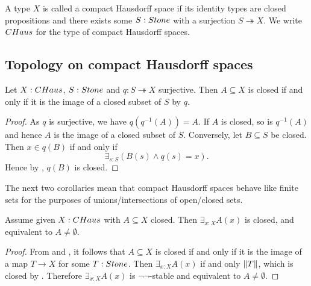 \begin{definition}
  A type $X$ is called a compact Hausdorff space if its identity types are closed propositions and there exists some $S:\Stone$ with a surjection $S\twoheadrightarrow X$. We write $\CHaus$ for the type of compact Hausdorff spaces.
\end{definition}


\subsection{Topology on compact Hausdorff spaces}

\begin{lemma}\label{CompactHausdorffClosed}
  Let $X:\CHaus$, $S:\Stone$ and $q:S\twoheadrightarrow X$ surjective.
  Then $A\subseteq X$ is closed if and only if it is the image of a closed subset of $S$ by $q$. 
\end{lemma}
\begin{proof}
  As $q$ is surjective, we have $q(q^{-1}(A)) = A$.
  If $A$ is closed, so is $q^{-1}(A)$ and 
  hence $A$ is the image of a closed subset of $S$. 
  Conversely, let $B\subseteq S$ be closed. Then $x\in q(B)$ if and only if
   \[\exists_{s:S} (B(s) \wedge q(s) = x).\]
   Hence by , $q(B)$ is closed. 
\end{proof}

The next two corollaries mean that compact Hausdorff spaces behave like finite sets for the purposes of unions/intersections of open/closed sets.

\begin{corollary}\label{InhabitedClosedSubSpaceClosedCHaus}
Assume given $X:\Chaus$ with $A\subseteq X$ closed. Then $\exists_{x:X} A(x)$ is closed, and equivalent to $A \neq \emptyset$. 
\end{corollary}

\begin{proof}
From  and , it follows that $A\subseteq X$ is closed if and only if it is the image of a map $T\to X$ for some $T:\Stone$. Then $\exists_{x:X} A(x)$ if and only $\lVert T \rVert$, which is closed by . Therefore $\exists_{x:X} A(x)$ is $\neg\neg$-stable and equivalent to $A \neq \emptyset$. 
\end{proof}

